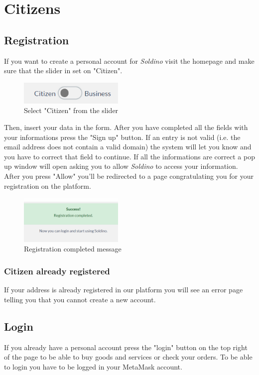 \section{Citizens}
	\subsection{Registration}
	If you want to create a personal account for \textit{Soldino} visit the
	homepage and make sure that the slider in set on "Citizen".\\
	\begin{figure}[H]
		\includegraphics[width=5cm]{res/images/user_citizen.png}
		\centering
		\caption{Select "Citizen" from the slider}
	\end{figure}	
	Then, insert your data in the form. After you have completed all the
	fields with your informations press the "Sign up" button. If an entry 
	is not valid (i.e. the email address does not contain a valid domain) 
	the system will let you know and you have to correct that field to continue.
	If all the informations are correct a pop up window will open asking you 
	to allow \textit{Soldino} to access your information.\\
	After you press "Allow" you'll be redirected to a page congratulating you 
	for your registration on the platform.
	\begin{figure}[H]
		\includegraphics[width=5cm]{res/images/registration_complete.png}
		\centering
		\caption{Registration completed message}
	\end{figure}
	\subsubsection{Citizen already registered}
	If your address is already registered in our platform you will see an
	error page telling you that you cannot create a new account.
	\subsection{Login}
	If you already have a personal account press the "login" button on the 
	top right of the page to be able to buy goods and services or check your
	orders. To be able to login you have to be logged in your MetaMask account.
